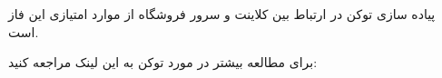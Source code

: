 \documentclass[]{article}
\begin{document}
پیاده سازی توکن در ارتباط بین کلاینت و سرور فروشگاه از موارد امتیازی این فاز است.

برای مطالعه بیشتر در مورد توکن به این لینک مراجعه کنید:


\begin{center}
\href{https://scotch.io/tutorials/the-ins-and-outs-of-token-based-authentication}{\textcolor{blue}{\underline{}}}

\end{center}
\end{document}

